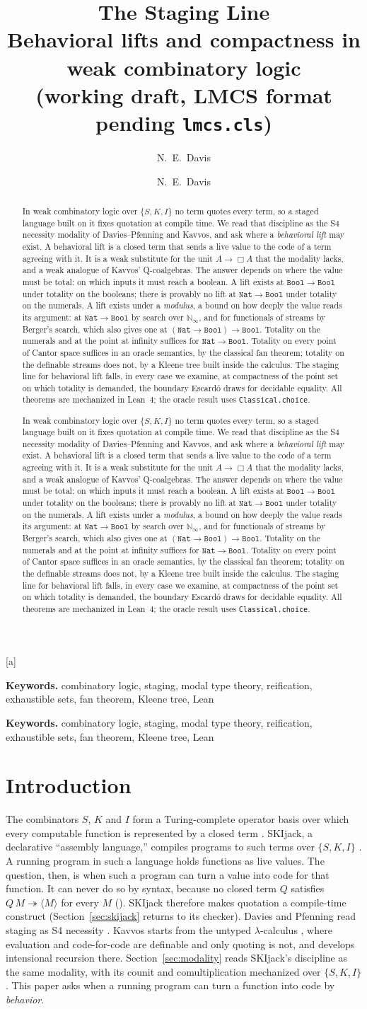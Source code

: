 \documentclass[acmsmall,review,screen]{acmart}\def\acmclass{}
\providecommand{\keywords}[1]{\par\noindent\textbf{Keywords.} #1\par}
\theoremstyle{plain}
\theoremstyle{definition}
\theoremstyle{remark}
\newcommand{\code}[1]{\langle #1\rangle}
\newcommand{\red}{\twoheadrightarrow}
\newcommand{\Nat}{\mathtt{Nat}}
\newcommand{\Bool}{\mathtt{Bool}}
\newcommand{\theabstract}{%
In weak combinatory logic over $\{S,K,I\}$ no term quotes every term, so a staged
language built on it fixes quotation at compile time.  We read that discipline as the
S4 necessity modality of Davies--Pfenning and Kavvos, and ask where a
\emph{behavioral lift} may exist.  A behavioral lift is a closed term that sends a live
value to the code of a term agreeing with it.  It is a weak substitute for the unit $A\to\Box A$ that the
modality lacks, and a weak analogue of Kavvos' Q-coalgebras.  The answer depends on
where the value must be total: on which inputs it must reach a boolean.  A lift
exists at $\Bool\to\Bool$ under totality on the booleans; there is provably no lift at
$\Nat\to\Bool$ under totality on the numerals.  A lift exists under a \emph{modulus}, a bound on how
deeply the value reads its argument: at $\Nat\to\Bool$ by search over
$\mathbb{N}_\infty$, and for functionals of streams by Berger's search, which also gives
one at $(\Nat\to\Bool)\to\Bool$.  Totality on the numerals and at the point at infinity
suffices for $\Nat\to\Bool$.  Totality on every point of Cantor space suffices in an
oracle semantics, by the classical fan theorem; totality on the definable streams does
not, by a Kleene tree built inside the calculus.  The staging
line for behavioral lift falls, in every case we examine, at compactness of the point set on which totality is
demanded, the boundary Escard\'o draws for decidable equality.  All theorems are
mechanized in Lean~4; the oracle result uses \texttt{Classical.choice}.}
\begin{document}
  \author[N.~E.~Davis]{N.~E.~Davis}[a]
  \address{ZeroAttest, Champaign, Illinois}
  \keywords{combinatory logic, staging, modal type theory, reification, exhaustible sets,
  fan theorem, Kleene tree, Lean}
  \begin{abstract}\theabstract\end{abstract}
  \maketitle
\else
  \title{The Staging Line\\[2pt]\large Behavioral lifts and compactness in weak
    combinatory logic\\[2pt]\normalsize(working draft, LMCS format pending \texttt{lmcs.cls})}
  \author{N.\ E.\ Davis}
  \date{}
  \maketitle
  \begin{abstract}\theabstract\end{abstract}
  \keywords{combinatory logic, staging, modal type theory, reification, exhaustible sets,
  fan theorem, Kleene tree, Lean}
\fi\fi\fi


\section{Introduction}\label{sec:intro}
The combinators $S$, $K$ and $I$ form a Turing-complete operator basis over which every
computable function is represented by a closed term \citep{HindleySeldin2008}.  SKIjack, a declarative
``assembly language,'' compiles programs to such terms over $\{S,K,I\}$ \citep{DavisND,skijack}.
A running program in such a language holds functions as live values.  The question, then,
is when such a program can turn a value into code for that function.  It can never do
so by syntax, because no closed term $Q$ satisfies $Q\,M \red \code{M}$ for every
$M$ \citep{Barendregt1991,DavisMeta} ().  SKIjack
therefore makes quotation a compile-time construct (Section~\ref{sec:skijack} returns to
its checker).  Davies and Pfenning read staging as S4 necessity \citep{DaviesPfenning2001}.
Kavvos starts from the untyped $\lambda$-calculus \citep{Kavvos2017}, where evaluation
and code-for-code are definable and only quoting is not, and develops intensional
recursion there.  Section~\ref{sec:modality} reads SKIjack's
discipline as the same modality, with its counit and comultiplication mechanized over
$\{S,K,I\}$.  This paper asks when a running program can turn a function into code by
\emph{behavior}.
\end{document}
